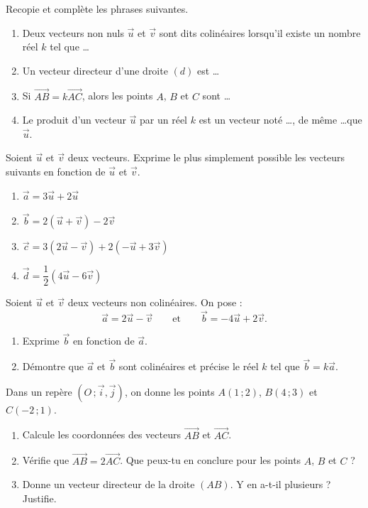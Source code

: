 \documentclass[11pt]{article}
\newcommand{\cle}[1]{{\popxbold\color{popdark}#1}}
\newcounter{popsec}
\newcounter{popsub}
\newcommand{\courssub}[1]{%
  \stepcounter{popsub}%
  \par\vspace{9pt}\noindent{\popxbold\fontsize{11.5}{13}\selectfont\color{popink}{\color{poporange}\thepopsec.\thepopsub}\hspace{6pt}#1}\par\nopagebreak\vspace{4pt}
}
\begin{document}
\begin{exercice}
Recopie et complète les phrases suivantes.
\begin{enumerate}
\item Deux vecteurs non nuls $\vec{u}$ et $\vec{v}$ sont dits \cle{colinéaires} lorsqu'il existe un nombre réel $k$ tel que \ldots
\item Un \cle{vecteur directeur} d'une droite $(d)$ est \ldots
\item Si $\overrightarrow{AB} = k\overrightarrow{AC}$, alors les points $A$, $B$ et $C$ sont \ldots
\item Le produit d'un vecteur $\vec{u}$ par un réel $k$ est un vecteur noté \ldots, de même \ldots que $\vec{u}$.
\end{enumerate}
\end{exercice}

\begin{exercice}
Soient $\vec{u}$ et $\vec{v}$ deux vecteurs. Exprime le plus simplement possible les vecteurs suivants en fonction de $\vec{u}$ et $\vec{v}$.
\begin{enumerate}
\item $\vec{a} = 3\vec{u} + 2\vec{u}$
\item $\vec{b} = 2(\vec{u} + \vec{v}) - 2\vec{v}$
\item $\vec{c} = 3(2\vec{u} - \vec{v}) + 2(-\vec{u} + 3\vec{v})$
\item $\vec{d} = \dfrac{1}{2}\left(4\vec{u} - 6\vec{v}\right)$
\end{enumerate}
\end{exercice}

\courssub{Je m'entraîne}

\begin{exercice}
Soient $\vec{u}$ et $\vec{v}$ deux vecteurs non colinéaires. On pose :
\[ \vec{a} = 2\vec{u} - \vec{v} \qquad \text{et} \qquad \vec{b} = -4\vec{u} + 2\vec{v}. \]
\begin{enumerate}
\item Exprime $\vec{b}$ en fonction de $\vec{a}$.
\item Démontre que $\vec{a}$ et $\vec{b}$ sont colinéaires et précise le réel $k$ tel que $\vec{b} = k\vec{a}$.
\end{enumerate}
\end{exercice}

\begin{exercice}
Dans un repère $(O\,;\vec{i},\vec{j})$, on donne les points $A(1\,;2)$, $B(4\,;3)$ et $C(-2\,;1)$.
\begin{enumerate}
\item Calcule les coordonnées des vecteurs $\overrightarrow{AB}$ et $\overrightarrow{AC}$.
\item Vérifie que $\overrightarrow{AB} = 2\overrightarrow{AC}$. Que peux-tu en conclure pour les points $A$, $B$ et $C$ ?
\item Donne un vecteur directeur de la droite $(AB)$. Y en a-t-il plusieurs ? Justifie.
\end{enumerate}
\end{exercice}
\end{document}
